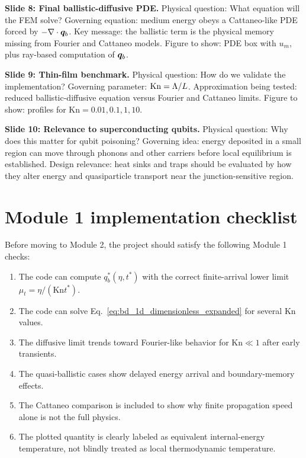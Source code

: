 \documentclass[11pt]{article}
\begin{document}
\begin{notebox}
\textbf{Slide 8: Final ballistic-diffusive PDE.}
Physical question: What equation will the FEM solve? Governing equation: medium energy obeys a Cattaneo-like PDE forced by \(-\nabla\cdot\bm{q}_b\). Key message: the ballistic term is the physical memory missing from Fourier and Cattaneo models. Figure to show: PDE box with \(u_m\), plus ray-based computation of \(\bm{q}_b\).
\end{notebox}

\begin{notebox}
\textbf{Slide 9: Thin-film benchmark.}
Physical question: How do we validate the implementation? Governing parameter: \(\mathrm{Kn}=\Lambda/L\). Approximation being tested: reduced ballistic-diffusive equation versus Fourier and Cattaneo limits. Figure to show: profiles for \(\mathrm{Kn}=0.01,0.1,1,10\).
\end{notebox}

\begin{notebox}
\textbf{Slide 10: Relevance to superconducting qubits.}
Physical question: Why does this matter for qubit poisoning? Governing idea: energy deposited in a small region can move through phonons and other carriers before local equilibrium is established. Design relevance: heat sinks and traps should be evaluated by how they alter energy and quasiparticle transport near the junction-sensitive region.
\end{notebox}

\section{Module 1 implementation checklist}
Before moving to Module 2, the project should satisfy the following Module 1 checks:
\begin{enumerate}[leftmargin=1.6em]
    \item The code can compute \(q_b^*(\eta,t^*)\) with the correct finite-arrival lower limit \(\mu_t=\eta/(\mathrm{Kn}t^*)\).
    \item The code can solve Eq.~\eqref{eq:bd_1d_dimensionless_expanded} for several \(\mathrm{Kn}\) values.
    \item The diffusive limit trends toward Fourier-like behavior for \(\mathrm{Kn}\ll 1\) after early transients.
    \item The quasi-ballistic cases show delayed energy arrival and boundary-memory effects.
    \item The Cattaneo comparison is included to show why finite propagation speed alone is not the full physics.
    \item The plotted quantity is clearly labeled as equivalent internal-energy temperature, not blindly treated as local thermodynamic temperature.
\end{enumerate}
\end{document}
